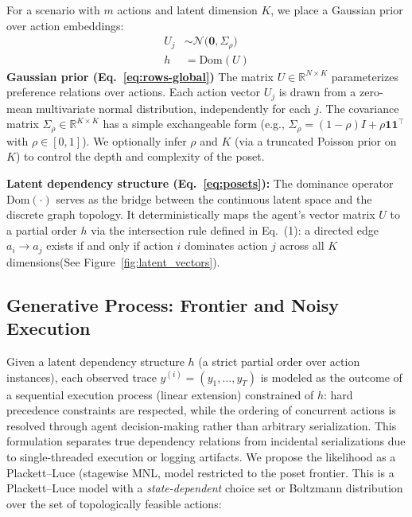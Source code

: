 \documentclass{article}
\theoremstyle{plain}
\theoremstyle{definition}
\theoremstyle{remark}
\begin{document}
For a scenario with $m$ actions and latent dimension $K$, we place a Gaussian prior over action embeddings:
\begin{align}
  U_{j} &\sim \mathcal{N}\!\bigl(\mathbf 0,\Sigma_\rho\bigr)\label{eq:rows-global}\\
  h &= \text{Dom}(U) \label{eq:posets}
\end{align}
\noindent \textbf{Gaussian prior (Eq.~\ref{eq:rows-global})}
The matrix $U \in \mathbb{R}^{N \times K}$ parameterizes preference relations over actions. Each action vector $U_{j}$ is drawn from a zero-mean multivariate normal distribution, independently for each $j$. The covariance matrix $\Sigma_\rho \in \mathbb{R}^{K\times K}$ has a simple exchangeable form (e.g., $\Sigma_\rho = (1-\rho)I + \rho \mathbf{1}\mathbf{1}^\top$ with $\rho\in[0,1]$).
We optionally infer $\rho$ and $K$ (via a truncated Poisson prior on $K$) to control the depth and complexity
of the poset.

\textbf{Latent dependency structure  (Eq.~\ref{eq:posets}):} 
The dominance operator $\text{Dom}(\cdot)$ serves as the bridge between the continuous latent space and the discrete graph topology. It deterministically maps the agent's vector matrix $U$ to a partial order $h$ via the intersection rule defined in Eq.~(1): a directed edge $a_i \to a_j$ exists if and only if action $i$ dominates action $j$ across all $K$ dimensions(See Figure~\ref{fig:latent_vectors}). 

\subsection{Generative Process: Frontier and Noisy Execution}
\label{subsec:gen}

Given a latent dependency structure $h$ (a strict partial order over action instances), each observed trace
$y^{(i)}=(y_1,\ldots,y_T)$ is modeled as the outcome of a sequential execution process (linear extension) constrained of $h$: hard precedence constraints are respected, while the ordering of concurrent actions is resolved through agent decision-making rather than arbitrary serialization. This formulation separates true dependency relations from incidental serializations due to single-threaded execution or logging artifacts. We propose the likelihood as a Plackett–Luce (stagewise MNL, \citep{luce1959individual} model restricted to the poset frontier. This is a Plackett--Luce model with a \emph{state-dependent} choice set or Boltzmann distribution \cite{ziebart2008maximum} over the set of topologically feasible actions:
\end{document}
